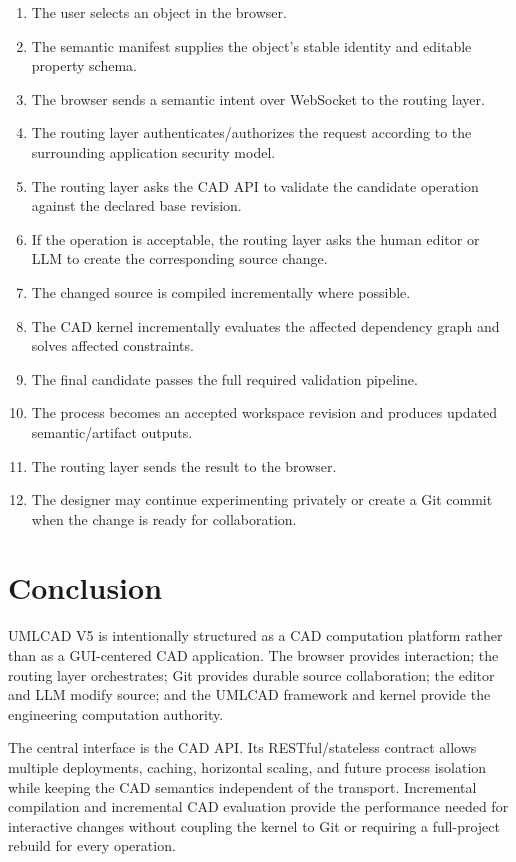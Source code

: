 \documentclass[11pt,a4paper]{article}
\begin{document}
\begin{enumerate}
    \item The user selects an object in the browser.
    \item The semantic manifest supplies the object's stable identity and editable property schema.
    \item The browser sends a semantic intent over WebSocket to the routing layer.
    \item The routing layer authenticates/authorizes the request according to the surrounding application security model.
    \item The routing layer asks the CAD API to validate the candidate operation against the declared base revision.
    \item If the operation is acceptable, the routing layer asks the human editor or LLM to create the corresponding source change.
    \item The changed source is compiled incrementally where possible.
    \item The CAD kernel incrementally evaluates the affected dependency graph and solves affected constraints.
    \item The final candidate passes the full required validation pipeline.
    \item The process becomes an accepted workspace revision and produces updated semantic/artifact outputs.
    \item The routing layer sends the result to the browser.
    \item The designer may continue experimenting privately or create a Git commit when the change is ready for collaboration.
\end{enumerate}

\section{Conclusion}

UMLCAD V5 is intentionally structured as a CAD computation platform rather than as a GUI-centered CAD application. The browser provides interaction; the routing layer orchestrates; Git provides durable source collaboration; the editor and LLM modify source; and the UMLCAD framework and kernel provide the engineering computation authority.

The central interface is the CAD API. Its RESTful/stateless contract allows multiple deployments, caching, horizontal scaling, and future process isolation while keeping the CAD semantics independent of the transport. Incremental compilation and incremental CAD evaluation provide the performance needed for interactive changes without coupling the kernel to Git or requiring a full-project rebuild for every operation.
\end{document}
